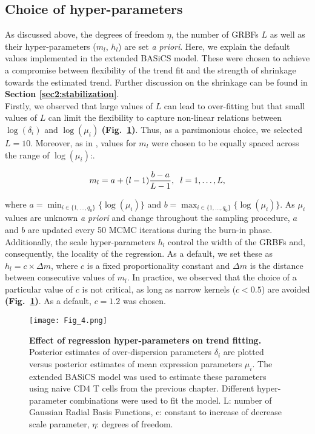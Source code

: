 \subsection{Choice of hyper-parameters} \label{sec2:hyper-parameters}

As discussed above, the degrees of freedom $\eta$, the number of GRBFs  $L$ as well as their hyper-parameters ($m_l$, $h_l$) are set \emph{a priori}. Here, we explain the default values implemented in the extended BASiCS model. These were chosen to achieve a compromise between flexibility of the trend fit and the strength of shrinkage towards the estimated trend. Further discussion on the shrinkage can be found in \textbf{Section \ref{sec2:stabilization}}. \\ 

Firstly, we observed that large values of $L$ can lead to over-fitting but that small values of $L$ can limit the flexibility to capture non-linear relations between $\log(\delta_i)$ and $\log(\mu_i)$ \textbf{(Fig.~\ref{fig2:choice_hyper})}. Thus, as a parsimonious choice, we selected $L = 10$. Moreover, as in \cite{Kapourani2016}, values for $m_l$ were chosen to be equally spaced across the range of $\log(\mu_i)$:. 

\begin{equation} m_l = a + (l-1)\frac{b - a }{L-1}, \hspace{0.2cm}  l=1,\ldots, L, \end{equation} 

where $a=\min_{i\in\{1,\ldots,q_0\}}\{\log(\mu_i)\}$ and $b=\max_{i\in\{1,\ldots,q_0\}}\{\log(\mu_i)\}$. As $\mu_i$ values are unknown \emph{a priori} and change throughout the sampling procedure, $a$ and $b$ are updated every 50 MCMC iterations during the burn-in phase. Additionally, the scale hyper-parameters $h_l$ control the width of the GRBFs and, consequently, the locality of the regression. As a default, we set these as $h_l = c \times \Delta m$, where $c$ is a fixed proportionality constant and $\Delta m$ is the distance between consecutive values of $m_l$. In practice, we observed that the choice of a particular value of $c$ is not critical, as long as narrow kernels ($c<0.5$) are avoided \textbf{(Fig.~\ref{fig2:choice_hyper})}. As a default, $c = 1.2$ was chosen. \\

\begin{figure}[!h]
\centering
\texttt{[image: Fig\_4.png]}
\caption[Effect of regression hyper-parameters on trend fitting]{\textbf{Effect of regression hyper-parameters on trend fitting.}\\
Posterior estimates of over-dispersion parameters $\delta_i$ are plotted versus posterior estimates of mean expression parameters $\mu_i$. The extended BASiCS model was used to estimate these parameters using naive CD4\plus{} T cells from the previous chapter. Different hyper-parameter combinations were used to fit the model. L: number of Gaussian Radial Basis Functions, c: constant to increase of decrease scale parameter, $\eta$: degrees of freedom.}
\label{fig2:choice_hyper}
\end{figure}

